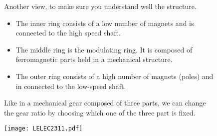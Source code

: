 \begin{figure}[H]
    \begin{minipage}{.45\linewidth}
        
       Another view, to make sure you understand well the structure. 
       \begin{itemize}
           \item The inner ring consists of a low number of magnets and is connected to the high speed shaft. 
           \item The middle ring is the modulating ring. It is composed of ferromagnetic parts held in a mechanical structure.
           \item The outer ring consists of a high number of magnets (poles) and in connected to the low-speed shaft. 
       \end{itemize}
       
       Like in a mechanical gear composed of three parts, we can change the gear ratio by choosing which one of the three part is fixed.


    \end{minipage}
    \hfill%
    \begin{minipage}[c]{.45\linewidth}
        \centering
        \texttt{[image: LELEC2311.pdf]}
    
    \end{minipage}
\end{figure}

